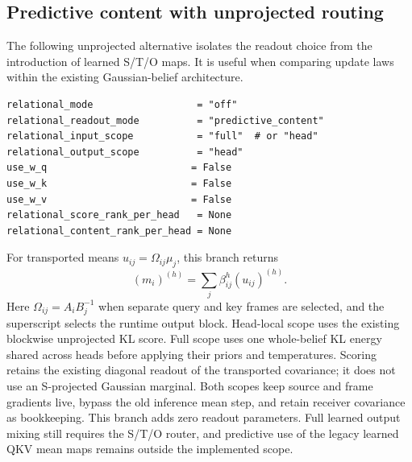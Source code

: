 \documentclass[11pt,letterpaper]{article}
\begin{document}
\subsection{Predictive content with unprojected routing}
The following unprojected alternative isolates the readout choice from the introduction of learned S/T/O maps. It is useful when comparing update laws within the existing Gaussian-belief architecture.
\begin{verbatim}
relational_mode                  = "off"
relational_readout_mode          = "predictive_content"
relational_input_scope           = "full"  # or "head"
relational_output_scope          = "head"
use_w_q                         = False
use_w_k                         = False
use_w_v                         = False
relational_score_rank_per_head   = None
relational_content_rank_per_head = None
\end{verbatim}
For transported means $u_{ij}=\Omega_{ij}\mu_j$, this branch returns
\begin{equation}
 (m_i)^{(h)}=\sum_j\beta_{ij}^h(u_{ij})^{(h)}.
\end{equation}
Here $\Omega_{ij}=A_iB_j^{-1}$ when separate query and key frames are selected, and the superscript selects the runtime output block. Head-local scope uses the existing blockwise unprojected KL score. Full scope uses one whole-belief KL energy shared across heads before applying their priors and temperatures. Scoring retains the existing diagonal readout of the transported covariance; it does not use an S-projected Gaussian marginal. Both scopes keep source and frame gradients live, bypass the old inference mean step, and retain receiver covariance as bookkeeping. This branch adds zero readout parameters. Full learned output mixing still requires the S/T/O router, and predictive use of the legacy learned QKV mean maps remains outside the implemented scope.
\end{document}
